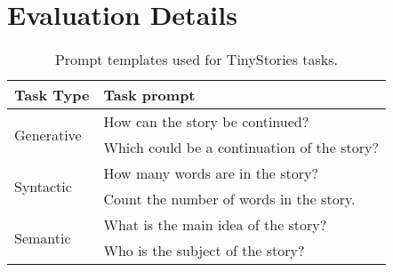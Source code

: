 \section{Evaluation Details} \label{sec:appendix}

\begin{table}[h]
\centering
\caption{Prompt templates used for TinyStories tasks.}
\label{tab:tinystories}
\begin{tabular}{l l}
\toprule
\textbf{Task Type} & \textbf{Task prompt} \\ 
\midrule
\multirow{2}{*}{Generative} 
    & How can the story be continued? \\  
    & Which could be a continuation of the story? \\  
\midrule
\multirow{2}{*}{Syntactic} 
    & How many words are in the story? \\  
    & Count the number of words in the story. \\  
\midrule
\multirow{2}{*}{Semantic} 
    & What is the main idea of the story? \\  
    & Who is the subject of the story? \\  
\bottomrule
\end{tabular}
\end{table}


